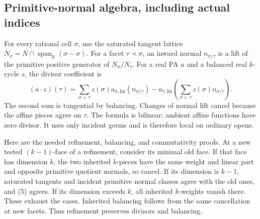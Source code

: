\documentclass[
  11pt,
]{article}
\begin{document}
\subsection{Primitive-normal algebra, including actual
indices}\label{primitive-normal-algebra-including-actual-indices}

For every rational cell \(\sigma\), use the saturated tangent lattice
\(N_\sigma=N\cap\operatorname{span}_\mathbb R(\sigma-\sigma)\). For a
facet \(\tau\prec\sigma\), an inward normal \(n_{\sigma/\tau}\) is a
lift of the primitive positive generator of \(N_\sigma/N_\tau\). For a
real PA \(a\) and a balanced real \(k\)-cycle \(z\), the divisor
coefficient is \[
 (a\cdot z)(\tau)=\sum_{\sigma\succ\tau}z(\sigma)a_{\sigma,\mathrm{lin}}(n_{\sigma/\tau})
 -a_{\tau,\mathrm{lin}}\left(\sum_{\sigma\succ\tau}z(\sigma)n_{\sigma/\tau}\right).       \tag{5}
\] The second sum is tangential by balancing. Changes of normal lift
cancel because the affine pieces agree on \(\tau\). The formula is
bilinear; ambient affine functions have zero divisor. It uses only
incident germs and is therefore local on ordinary opens.

Here are the needed refinement, balancing, and commutativity proofs. At
a new tested \((k-1)\)-face of a refinement, consider its minimal old
face. If that face has dimension \(k\), the two inherited \(k\)-pieces
have the same weight and linear part and opposite primitive quotient
normals, so cancel. If its dimension is \(k-1\), saturated tangents and
incident primitive normal classes agree with the old ones, and (5)
agrees. If its dimension exceeds \(k\), all inherited \(k\)-weights
vanish there. These exhaust the cases. Inherited balancing follows from
the same cancellation at new facets. Thus refinement preserves divisors
and balancing.
\end{document}
